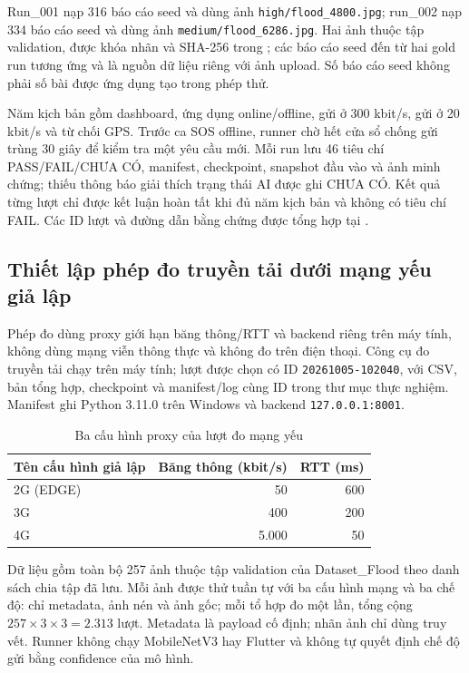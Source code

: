Run\_001 nạp 316 báo cáo seed và dùng ảnh \texttt{high/flood\_4800.jpg}; run\_002 nạp 334 báo cáo seed và dùng ảnh \texttt{medium/flood\_6286.jpg}. Hai ảnh thuộc tập validation, được khóa nhãn và SHA-256 trong ; các báo cáo seed đến từ hai gold run tương ứng và là nguồn dữ liệu riêng với ảnh upload. Số báo cáo seed không phải số bài được ứng dụng tạo trong phép thử.

Năm kịch bản gồm dashboard, ứng dụng online/offline, gửi ở 300 kbit/s, gửi ở 20 kbit/s và từ chối GPS. Trước ca SOS offline, runner chờ hết cửa sổ chống gửi trùng 30 giây để kiểm tra một yêu cầu mới. Mỗi run lưu 46 tiêu chí PASS/FAIL/CHƯA CÓ, manifest, checkpoint, snapshot đầu vào và ảnh minh chứng; thiếu thông báo giải thích trạng thái AI được ghi CHƯA CÓ. Kết quả từng lượt chỉ được kết luận hoàn tất khi đủ năm kịch bản và không có tiêu chí FAIL. Các ID lượt và đường dẫn bằng chứng được tổng hợp tại .

\subsection{Thiết lập phép đo truyền tải dưới mạng yếu giả lập}\label{sec:weak-network-setup}
Phép đo dùng proxy giới hạn băng thông/RTT và backend riêng trên máy tính, không dùng mạng viễn thông thực và không đo trên điện thoại. Công cụ đo truyền tải chạy trên máy tính; lượt được chọn có ID \texttt{20261005-102040}, với CSV, bản tổng hợp, checkpoint và manifest/log cùng ID trong thư mục thực nghiệm. Manifest ghi Python 3.11.0 trên Windows và backend \texttt{127.0.0.1:8001}.

\begin{table}[htbp]\centering
\caption{Ba cấu hình proxy của lượt đo mạng yếu}
\label{tab:weak-network-profiles}
\begin{tabular}{lrr}
\toprule Tên cấu hình giả lập & Băng thông (kbit/s) & RTT (ms) \\
\midrule
2G (EDGE) & 50 & 600 \\
3G & 400 & 200 \\
4G & 5.000 & 50 \\
\bottomrule
\end{tabular}
\end{table}
Dữ liệu gồm toàn bộ 257 ảnh thuộc tập validation của Dataset\_Flood theo danh sách chia tập đã lưu. Mỗi ảnh được thử tuần tự với ba cấu hình mạng và ba chế độ: chỉ metadata, ảnh nén và ảnh gốc; mỗi tổ hợp đo một lần, tổng cộng $257\times3\times3=2.313$ lượt. Metadata là payload cố định; nhãn ảnh chỉ dùng truy vết. Runner không chạy MobileNetV3 hay Flutter và không tự quyết định chế độ gửi bằng confidence của mô hình.

